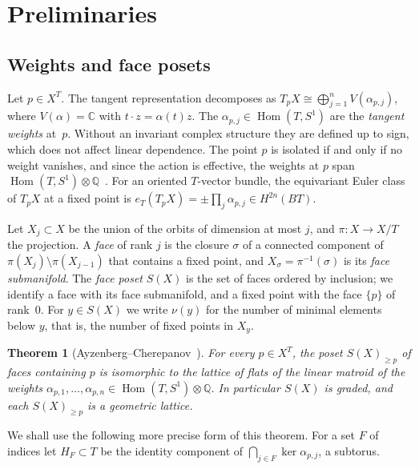 \documentclass[11pt,a4paper]{article}
\numberwithin{equation}{section}
\theoremstyle{plain}
\newtheorem{theorem}{Theorem}[section]
\theoremstyle{definition}
\theoremstyle{remark}
\newcommand{\Q}{\mathbb{Q}}
\newcommand{\C}{\mathbb{C}}
\DeclareMathOperator{\Hom}{Hom}
\begin{document}
\section{Preliminaries}\label{sec:prelim}

\subsection{Weights and face posets}
Let $p\in X^T$. The tangent representation decomposes as $T_pX\cong\bigoplus_{j=1}^nV(\alpha_{p,j})$, where $V(\alpha)=\C$ with $t\cdot z=\alpha(t)z$. The $\alpha_{p,j}\in\Hom(T,S^1)$ are the \emph{tangent weights} at~$p$. Without an invariant complex structure they are defined up to sign, which does not affect linear dependence. The point $p$ is isolated if and only if no weight vanishes, and since the action is effective, the weights at $p$ span $\Hom(T,S^1)\otimes\Q$~\cite[Constr.~2.3]{AC22}. For an oriented $T$-vector bundle, the equivariant Euler class of $T_pX$ at a fixed point is $e_T(T_pX)=\pm\prod_j\alpha_{p,j}\in H^{2n}(BT)$.

Let $X_j\subset X$ be the union of the orbits of dimension at most $j$, and $\pi\colon X\to X/T$ the projection. A \emph{face} of rank $j$ is the closure $\sigma$ of a connected component of $\pi(X_j)\setminus\pi(X_{j-1})$ that contains a fixed point, and $X_\sigma=\pi^{-1}(\sigma)$ is its \emph{face submanifold}. The \emph{face poset} $S(X)$ is the set of faces ordered by inclusion; we identify a face with its face submanifold, and a fixed point with the face $\{p\}$ of rank~$0$. For $y\in S(X)$ we write $\nu(y)$ for the number of minimal elements below $y$, that is, the number of fixed points in $X_y$.

\begin{theorem}[Ayzenberg--Cherepanov~{\cite[Thm.~1]{AC22}}]\label{thm:AC}
For every $p\in X^T$, the poset $S(X)_{\geqslant p}$ of faces containing $p$ is isomorphic to the lattice of flats of the linear matroid of the weights $\alpha_{p,1},\dots,\alpha_{p,n}\in\Hom(T,S^1)\otimes\Q$. In particular $S(X)$ is graded, and each $S(X)_{\geqslant p}$ is a geometric lattice.
\end{theorem}

We shall use the following more precise form of this theorem. For a set $F$ of indices let $H_F\subset T$ be the identity component of $\bigcap_{j\in F}\ker\alpha_{p,j}$, a subtorus.
\end{document}
